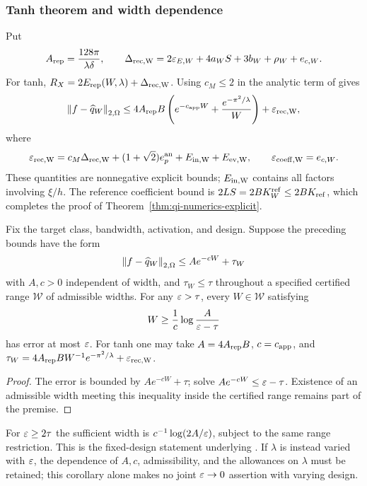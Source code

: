 \subsubsection{Tanh theorem and width dependence}
\label{sec:assemble}
Put
\begin{equation}
 A_{\rm rep}=\frac{128\pi}{\lambda\delta},\qquad
 \Delta_{\rm rec,W}=2\varepsilon_{E,W}+4a_WS+3b_W+\rho_W+e_{c,W}.
 \label{eq:Arep}
\end{equation}
For tanh, $R_X=2E_{\mathrm{rep}}(W,\lambda)+\Delta_{\rm rec,W}$.
Using $c_M\le2$ in the analytic term of  gives
\begin{equation}
 \left\lVert f-\widehat q_W\right\rVert_{2,\Omega}
 \le4A_{\rm rep}B\left(e^{-c_{\mathrm{app}} W}+\frac{e^{-\pi^2/\lambda}}W\right)
       +\varepsilon_{\rm rec,W},
 \label{eq:final-decomp}
\end{equation}
where
\begin{equation}
 \varepsilon_{\rm rec,W}=c_M\Delta_{\rm rec,W}
 +(1+\sqrt2)e_p^{\rm an}+E_{\rm in,W}+E_{\rm ev,W},
 \qquad \varepsilon_{\rm coeff,W}=e_{c,W}.
 \label{eq:epsrec}
\end{equation}
These quantities are nonnegative explicit bounds; $E_{\rm in,W}$ contains
all factors involving $\xi/h$. The reference coefficient bound is
$2LS=2B K_W^{\rm ref}\le2BK_{\rm ref}$, which completes the proof of
Theorem~\ref{thm:qi-numerics-explicit}.

\begin{corollary}
\label{cor:logwidth}
Fix the target class, bandwidth, activation, and design. Suppose the preceding
bounds have the form
\[
 \left\lVert f-\widehat q_W\right\rVert_{2,\Omega}\le A e^{-cW}+\tau_W
\]
with $A,c>0$ independent of width, and $\tau_W\le\tau$ throughout a specified
certified range $\mathcal W$ of admissible widths. For any $\varepsilon>\tau$, every
$W\in\mathcal W$ satisfying
\begin{equation}
 W\ge\frac1c\log\frac A{\varepsilon-\tau}
 \label{eq:log-width}
\end{equation}
has error at most $\varepsilon$. For tanh one may take $A=4A_{\rm rep}B$,
$c=c_{\mathrm{app}}$, and
$\tau_W=4A_{\rm rep}B W^{-1}e^{-\pi^2/\lambda}+\varepsilon_{\rm rec,W}$.
\end{corollary}
\begin{proof}
The error is bounded by $Ae^{-cW}+\tau$; solve
$Ae^{-cW}\le\varepsilon-\tau$. Existence of an admissible width meeting this
inequality inside the certified range remains part of the premise.
\end{proof}
For $\varepsilon\ge2\tau$ the sufficient width is
$c^{-1}\log(2A/\varepsilon)$, subject to the same range restriction. This is the
fixed-design statement underlying \QUILLMainCorollary. If $\lambda$ is
instead varied with $\varepsilon$, the dependence of $A,c$, admissibility, and the
allowances on $\lambda$ must be retained; this corollary alone makes no joint
$\varepsilon\to0$ assertion with varying design.


